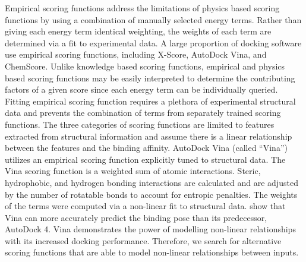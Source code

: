 \documentclass[journal=jcisd8,manuscript=article]{achemso}
\begin{document}
Empirical scoring functions address the limitations of physics based scoring functions by using a combination of manually selected energy terms. Rather than giving each energy term identical weighting, the weights of each term are determined via a fit to experimental data. A large proportion of docking software use empirical scoring functions, including X-Score, AutoDock Vina, and ChemScore\cite{wang2002further,trott2010autodock,eldridge1997empirical}. Unlike knowledge based scoring functions, empirical and physics based scoring functions may be easily interpreted to determine the contributing factors of a given score since each energy term can be individually queried. Fitting empirical scoring function requires a plethora of experimental structural data and prevents the combination of terms from separately trained scoring functions. The three categories of scoring functions are limited to features extracted from structural information and assume there is a linear relationship between the features and the binding affinity. AutoDock Vina (called ``Vina'') utilizes an empirical scoring function explicitly tuned to structural data\cite{trott2010autodock}. The Vina scoring function is a weighted sum of atomic interactions.  Steric, hydrophobic, and hydrogen bonding interactions are calculated and are adjusted by the number of rotatable bonds to account for entropic penalties. The weights of the terms were computed via a non-linear fit to structural data. \citet{nguyen2019autodock} show that Vina can more accurately predict the binding pose than its predecessor, AutoDock 4\cite{morris1998automated}. Vina demonstrates the power of modelling non-linear relationships with its increased docking performance. Therefore, we search for alternative scoring functions that are able to model non-linear relationships between inputs.
\end{document}
